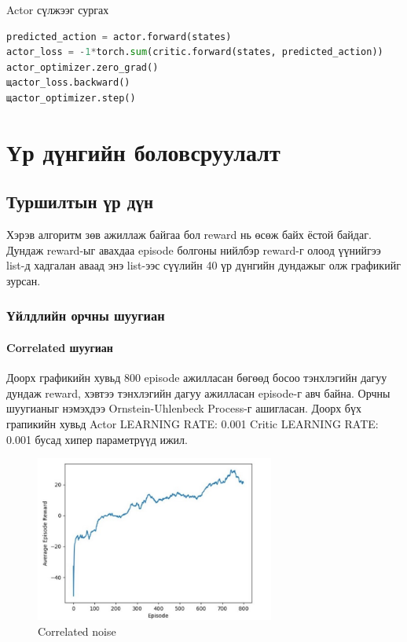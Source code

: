 \documentclass[12pt,A4]{report}
\begin{document}
Actor сүлжээг сургах

\begin{lstlisting}[language=Python, caption=Actor сүлжээг сургах, frame=single]
predicted_action = actor.forward(states)
actor_loss = -1*torch.sum(critic.forward(states, predicted_action))
actor_optimizer.zero_grad()
щactor_loss.backward()
щactor_optimizer.step()
\end{lstlisting}

\chapter{Үр дүнгийн боловсруулалт}

\section{Туршилтын үр дүн}

Хэрэв алгоритм зөв ажиллаж байгаа бол reward нь өсөж байх ёстой байдаг. Дундаж reward-ыг авахдаа episode болгоны нийлбэр reward-г олоод үүнийгээ list-д хадгалан аваад энэ list-ээс сүүлийн 40 үр дүнгийн дундажыг олж графикийг зурсан.

\subsection{Үйлдлийн орчны шуугиан}

\subsubsection{Correlated шуугиан}

Доорх графикийн хувьд 800 episode ажилласан бөгөөд босоо тэнхлэгийн дагуу дундаж reward, хэвтээ тэнхлэгийн дагуу ажилласан episode-г авч байна. Орчны шуугианыг нэмэхдээ Ornstein-Uhlenbeck Process-г ашигласан. Доорх бүх грапикийн хувьд Actor LEARNING RATE: 0.001 Critic LEARNING RATE: 0.001 бусад хипер параметрүүд ижил.

\begin{figure}[H]
\centering
\includegraphics[width=0.7\textwidth]{./images/after_800_ep}
\caption{Correlated noise}
\end{figure}
\end{document}
